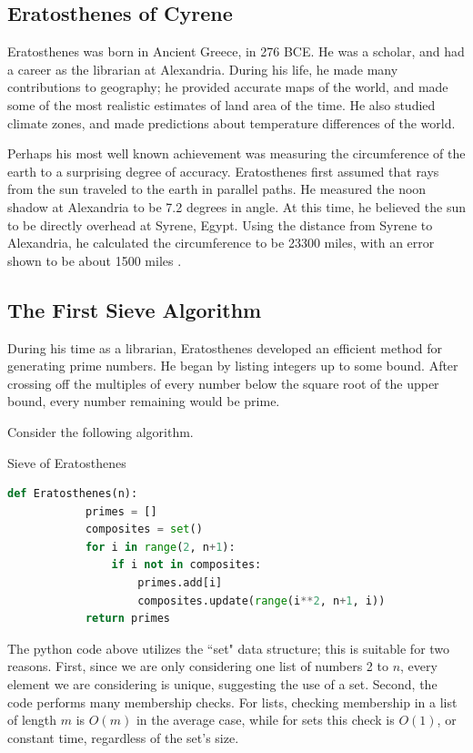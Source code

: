 \documentclass{amsart}
\theoremstyle{definition}
\theoremstyle{case}
\begin{document}
	\subsection{Eratosthenes of Cyrene}	
	Eratosthenes was born in Ancient Greece, in 276 BCE. He was a scholar, and had a career as the librarian at Alexandria. During his life, he made many contributions to geography; he provided accurate maps of the world, and made some of the most realistic estimates of land area of the time. He also studied climate zones, and made predictions about temperature differences of the world. 
	
	Perhaps his most well known achievement was measuring the circumference of the earth to a surprising degree of accuracy. Eratosthenes first assumed that rays from the sun traveled to the earth in parallel paths. He measured the noon shadow at Alexandria to be 7.2 degrees in angle. At this time, he believed the sun to be directly overhead at Syrene, Egypt. Using the distance from Syrene to Alexandria, he calculated the circumference to be 23300 miles, with an error shown to be about 1500 miles \cite{lawson2004}. 
	
	\subsection{The First Sieve Algorithm}
	
	During his time as a librarian, Eratosthenes developed an efficient method for generating prime numbers. He began by listing integers up to some bound. After crossing off the multiples of every number below the square root of the upper bound, every number remaining would be prime.
	
	Consider the following algorithm.
	
	\begin{Algorithm}[H]\caption{Sieve of Eratosthenes}
		\begin{lstlisting}[language=Python]
		def Eratosthenes(n):
		    primes = []
		    composites = set()
		    for i in range(2, n+1):
		        if i not in composites:
		            primes.add[i]
		            composites.update(range(i**2, n+1, i))
		    return primes
		\end{lstlisting}
	\end{Algorithm}
	
	The python code above utilizes the ``set" data structure; this is suitable for two reasons. First, since we are only considering one list of numbers 2 to $n$, every element we are considering is unique, suggesting the use of a set. Second, the code performs many membership checks. For lists, checking membership in a list of length $m$ is $O(m)$ in the average case, while for sets this check is $O(1)$, or constant time, regardless of the set's size.
	
\end{document}
